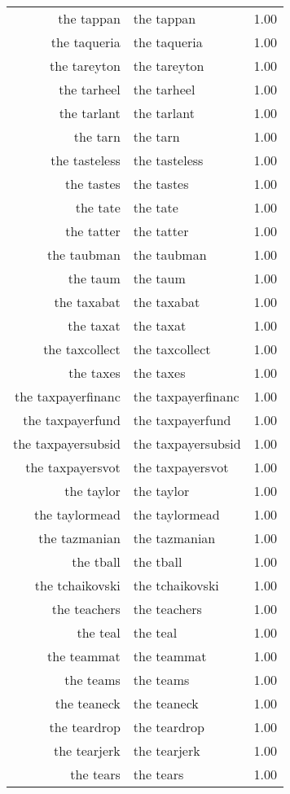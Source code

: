 \begin{table}[ht]
\begin{tabular}{rlr}
  the tappan & the tappan & 1.00 \\ 
  the taqueria & the taqueria & 1.00 \\ 
  the tareyton & the tareyton & 1.00 \\ 
  the tarheel & the tarheel & 1.00 \\ 
  the tarlant & the tarlant & 1.00 \\ 
  the tarn & the tarn & 1.00 \\ 
  the tasteless & the tasteless & 1.00 \\ 
  the tastes & the tastes & 1.00 \\ 
  the tate & the tate & 1.00 \\ 
  the tatter & the tatter & 1.00 \\ 
  the taubman & the taubman & 1.00 \\ 
  the taum & the taum & 1.00 \\ 
  the taxabat & the taxabat & 1.00 \\ 
  the taxat & the taxat & 1.00 \\ 
  the taxcollect & the taxcollect & 1.00 \\ 
  the taxes & the taxes & 1.00 \\ 
  the taxpayerfinanc & the taxpayerfinanc & 1.00 \\ 
  the taxpayerfund & the taxpayerfund & 1.00 \\ 
  the taxpayersubsid & the taxpayersubsid & 1.00 \\ 
  the taxpayersvot & the taxpayersvot & 1.00 \\ 
  the taylor & the taylor & 1.00 \\ 
  the taylormead & the taylormead & 1.00 \\ 
  the tazmanian & the tazmanian & 1.00 \\ 
  the tball & the tball & 1.00 \\ 
  the tchaikovski & the tchaikovski & 1.00 \\ 
  the teachers & the teachers & 1.00 \\ 
  the teal & the teal & 1.00 \\ 
  the teammat & the teammat & 1.00 \\ 
  the teams & the teams & 1.00 \\ 
  the teaneck & the teaneck & 1.00 \\ 
  the teardrop & the teardrop & 1.00 \\ 
  the tearjerk & the tearjerk & 1.00 \\ 
  the tears & the tears & 1.00 \\ 

\end{tabular}
\end{table}
